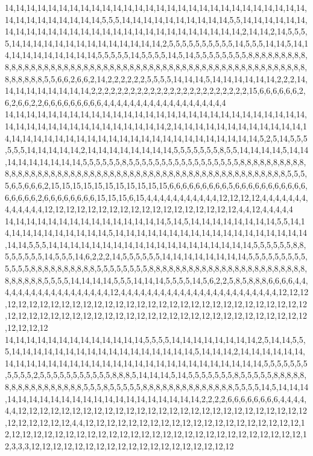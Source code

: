 14,14,14,14,14,14,14,14,14,14,14,14,14,14,14,14,14,14,14,14,14,14,14,14,14,14,14,14,14,14,14,14,14,14,14,14,14,5,5,5,14,14,14,14,14,14,14,14,14,14,5,5,14,14,14,14,14,14,14,14,14,14,14,14,14,14,14,14,14,14,14,14,14,14,14,14,14,14,14,14,2,14,14,2,14,5,5,5,5,14,14,14,14,14,14,14,14,14,14,14,14,14,14,2,5,5,5,5,5,5,5,5,5,5,14,5,5,5,14,14,5,14,14,14,14,14,14,14,14,14,14,5,5,5,5,5,14,5,5,5,5,14,5,14,5,5,5,5,5,5,5,5,8,8,8,8,8,8,8,8,8,8,8,8,8,8,8,8,8,8,8,8,8,8,8,8,8,8,8,8,8,8,8,8,8,8,8,8,8,8,8,8,8,8,8,8,8,8,8,8,8,8,8,8,8,8,8,8,8,8,8,8,8,5,5,6,6,2,6,6,2,14,2,2,2,2,2,2,5,5,5,5,14,14,14,5,14,14,14,14,14,14,2,2,2,14,14,14,14,14,14,14,14,14,2,2,2,2,2,2,2,2,2,2,2,2,2,2,2,2,2,2,2,2,2,2,2,2,15,6,6,6,6,6,6,2,6,2,6,6,2,2,6,6,6,6,6,6,6,6,6,4,4,4,4,4,4,4,4,4,4,4,4,4,4,4,4,4,4,4
14,14,14,14,14,14,14,14,14,14,14,14,14,14,14,14,14,14,14,14,14,14,14,14,14,14,14,14,14,14,14,14,14,14,14,14,14,14,14,14,14,14,14,2,14,14,14,14,14,14,14,14,14,14,14,14,14,14,14,14,14,14,14,14,14,14,14,14,14,14,14,14,14,14,14,14,14,14,14,14,5,2,5,14,5,5,5,5,5,5,14,14,14,14,14,2,14,14,14,14,14,14,14,14,5,5,5,5,5,5,5,8,5,5,14,14,14,14,5,14,14,14,14,14,14,14,14,14,5,5,5,5,5,5,8,5,5,5,5,5,5,5,5,5,5,5,5,5,5,5,5,5,8,8,8,8,8,8,8,8,8,8,8,8,8,8,8,8,8,8,8,8,8,8,8,8,8,8,8,8,8,8,8,8,8,8,8,8,8,8,8,8,8,8,8,8,8,8,8,8,8,8,8,8,8,5,5,5,5,6,5,6,6,6,2,15,15,15,15,15,15,15,15,15,15,15,6,6,6,6,6,6,6,6,6,5,6,6,6,6,6,6,6,6,6,6,6,6,6,6,6,6,2,6,6,6,6,6,6,6,6,15,15,15,6,15,4,4,4,4,4,4,4,4,4,4,4,12,12,12,12,4,4,4,4,4,4,4,4,4,4,4,4,4,12,12,12,12,12,12,12,12,12,12,12,12,12,12,12,12,12,12,4,4,12,4,4,4,4,4
14,14,14,14,14,14,14,14,14,14,14,14,14,14,14,5,14,5,14,14,14,14,14,14,14,14,5,5,14,14,14,14,14,14,14,14,14,14,14,5,14,14,14,14,14,14,14,14,14,14,14,14,14,14,14,14,14,14,14,14,5,5,5,14,14,14,14,14,14,14,14,14,14,14,14,14,14,14,14,14,14,14,5,5,5,5,5,5,8,8,5,5,5,5,5,5,14,5,5,5,14,6,2,2,2,14,5,5,5,5,5,5,14,14,14,14,14,14,14,14,5,5,5,5,5,5,5,5,5,5,5,5,5,8,8,8,8,8,8,8,8,8,8,5,5,5,5,5,5,5,5,8,8,8,8,8,8,8,8,8,8,8,8,8,8,8,8,8,8,8,8,8,8,8,8,8,8,8,8,8,8,5,5,5,5,14,14,14,14,5,5,5,14,14,14,5,5,5,5,14,5,6,2,2,5,8,5,8,8,8,6,6,6,6,4,4,4,4,4,4,4,4,4,4,4,4,4,4,4,4,4,4,12,4,4,4,4,4,4,4,4,4,4,4,4,4,4,4,4,4,4,4,4,4,4,4,4,12,12,12,12,12,12,12,12,12,12,12,12,12,12,12,12,12,12,12,12,12,12,12,12,12,12,12,12,12,12,12,12,12,12,12,12,12,12,12,12,12,12,12,12,12,12,12,12,12,12,12,12,12,12,12,12,12,12,12,12,12,12,12
14,14,14,14,14,14,14,14,14,14,14,14,14,5,5,5,5,14,14,14,14,14,14,14,14,2,5,14,14,5,5,5,14,14,14,14,14,14,14,14,14,14,14,14,14,14,14,14,14,5,14,14,14,2,14,14,14,14,14,14,14,14,14,14,14,14,14,14,14,14,14,14,14,14,14,14,14,14,14,14,14,14,14,14,5,5,5,5,5,5,5,5,5,5,5,2,5,5,5,5,5,5,5,5,5,5,5,8,8,8,5,14,14,14,5,14,5,5,5,5,5,5,5,8,5,5,5,5,5,8,8,8,8,8,8,8,8,8,8,8,8,8,8,8,8,8,5,5,5,8,5,5,5,5,5,8,8,8,8,8,8,8,8,8,8,8,8,8,8,5,5,5,5,14,5,14,14,14,14,14,14,14,14,14,14,14,14,14,14,14,14,14,14,14,14,14,2,2,2,2,6,6,6,6,6,6,6,6,4,4,4,4,4,4,12,12,12,12,12,12,12,12,12,12,12,12,12,12,12,12,12,12,12,12,12,12,12,12,12,12,12,12,12,12,12,12,12,4,4,12,12,12,12,12,12,12,12,12,12,12,12,12,12,12,12,12,12,12,12,12,12,12,12,12,12,12,12,12,12,12,12,12,12,12,12,12,12,12,12,12,12,12,12,12,12,12,12,12,3,3,3,12,12,12,12,12,12,12,12,12,12,12,12,12,12,12,12,12,12,12
